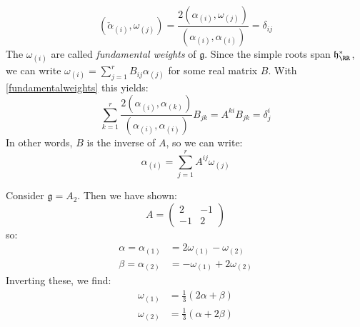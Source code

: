 \documentclass{jknotes}
\begin{document}
\begin{equation}
    (\check{\alpha}_{(i)},\omega_{(j)}) = \frac{2(\alpha_{(i)},\omega_{(j)})}{(\alpha_{(i)},\alpha_{(i)})} = \delta_{ij} \tag{\(*\)}
    \label{fundamentalweights}
\end{equation}
The \(\omega_{(i)}\) are called \emph{fundamental weights} of \(\mathfrak{g}\). Since the simple roots span \(\mathfrak{h}^*_\RR\), we can write \(\omega_{(i)} = \sum_{j=1}^r B_{ij} \alpha_{(j)}\) for some real matrix \(B\). With \eqref{fundamentalweights} this yields:
\begin{equation}
    \sum_{k=1}^r\frac{2(\alpha_{(i)},\alpha_{(k)})}{(\alpha_{(i)},\alpha_{(i)})} B_{jk} = A^{ki}B_{jk} = \delta^i_j
\end{equation}
In other words, \(B\) is the inverse of \(A\), so we can write:
\begin{equation}
    \alpha_{(i)} = \sum_{j=1}^rA^{ij}\omega_{(j)}
\end{equation}

\begin{eg}
    Consider \(\mathfrak{g}=A_2\). Then we have shown:
    \begin{equation}
        A = 
        \begin{pmatrix}
            2 & -1 \\
            -1 & 2
        \end{pmatrix}
    \end{equation}
    so:
    \begin{align}
        \alpha = \alpha_{(1)} &= 2 \omega_{(1)} - \omega_{(2)} \\
        \beta = \alpha_{(2)} &= - \omega_{(1)} + 2 \omega_{(2)}
    \end{align}
    Inverting these, we find:
    \begin{align}
        \omega_{(1)} &= \frac{1}{3}(2\alpha+\beta) \\
        \omega_{(2)} &= \frac{1}{3}(\alpha+2\beta)
    \end{align}
    \begin{figure}[H]
        \centering
    \end{figure}
\end{eg}
\end{document}
